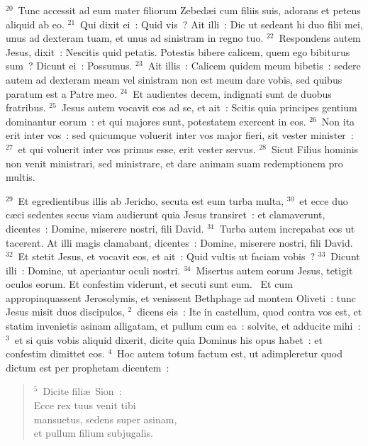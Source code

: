 ${}^{20}$~Tunc accessit ad eum mater filiorum Zebed\ae i cum filiis suis, adorans et petens aliquid ab eo.
${}^{21}$~Qui dixit ei~: Quid vis~? Ait illi~: Dic ut sedeant hi duo filii mei, unus ad dexteram tuam, et unus ad sinistram in regno tuo.
${}^{22}$~Respondens autem Jesus, dixit~: Nescitis quid petatis. Potestis bibere calicem, quem ego bibiturus sum~? Dicunt ei~: Possumus.
${}^{23}$~Ait illis~: Calicem quidem meum bibetis~: sedere autem ad dexteram meam vel sinistram non est meum dare vobis, sed quibus paratum est a Patre meo.
${}^{24}$~Et audientes decem, indignati sunt de duobus fratribus.
${}^{25}$~Jesus autem vocavit eos ad se, et ait~: Scitis quia principes gentium dominantur eorum~: et qui majores sunt, potestatem exercent in eos.
${}^{26}$~Non ita erit inter vos~: sed quicumque voluerit inter vos major fieri, sit vester minister~:
${}^{27}$~et qui voluerit inter vos primus esse, erit vester servus.
${}^{28}$~Sicut Filius hominis non venit ministrari, sed ministrare, et dare animam suam redemptionem pro multis.


${}^{29}$~Et egredientibus illis ab Jericho, secuta est eum turba multa,
${}^{30}$~et ecce duo c\ae ci sedentes secus viam audierunt quia Jesus transiret~: et clamaverunt, dicentes~: Domine, miserere nostri, fili David.
${}^{31}$~Turba autem increpabat eos ut tacerent. At illi magis clamabant, dicentes~: Domine, miserere nostri, fili David.
${}^{32}$~Et stetit Jesus, et vocavit eos, et ait~: Quid vultis ut faciam vobis~?
${}^{33}$~Dicunt illi~: Domine, ut aperiantur oculi nostri.
${}^{34}$~Misertus autem eorum Jesus, tetigit oculos eorum. Et confestim viderunt, et secuti sunt eum.
~Et cum appropinquassent Jerosolymis, et venissent Bethphage ad montem Oliveti~: tunc Jesus misit duos discipulos,
${}^{2}$~dicens eis~: Ite in castellum, quod contra vos est, et statim invenietis asinam alligatam, et pullum cum ea~: solvite, et adducite mihi~:
${}^{3}$~et si quis vobis aliquid dixerit, dicite quia Dominus his opus habet~: et confestim dimittet eos.
${}^{4}$~Hoc autem totum factum est, ut adimpleretur quod dictum est per prophetam dicentem~:
\begin{flushleft}\begin{verse}${}^{5}$~Dicite fili\ae\ Sion~:\\ Ecce rex tuus venit tibi\\ mansuetus, sedens super asinam,\\ et pullum filium subjugalis.\end{verse}\end{flushleft}


